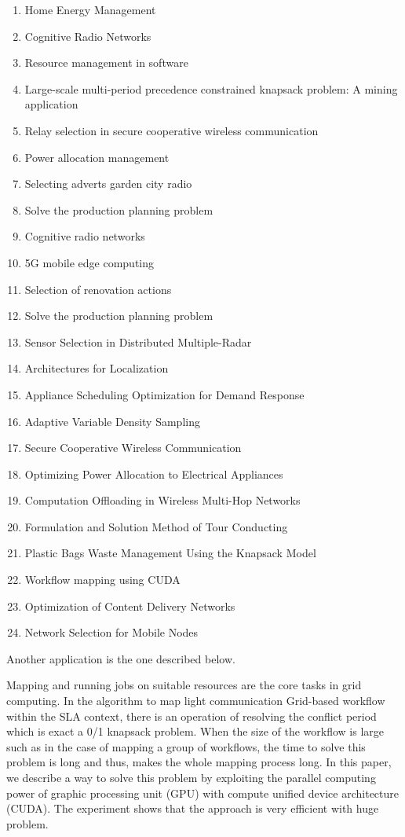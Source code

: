 \documentclass[12pt]{article}
\begin{document}
\begin{enumerate}
    \item Home Energy Management
    \item Cognitive Radio Networks
    \item Resource management in software
    \item Large-scale multi-period precedence constrained knapsack problem: A mining application
    \item Relay selection in secure cooperative wireless communication
    \item Power allocation management
    \item Selecting adverts garden city radio
    \item Solve the production planning problem
    \item Cognitive radio networks
    \item 5G mobile edge computing
    \item Selection of renovation actions
    \item Solve the production planning problem
    \item Sensor Selection in Distributed Multiple-Radar
    \item Architectures for Localization
    \item Appliance Scheduling Optimization for Demand Response
    \item Adaptive Variable Density Sampling
    \item Secure Cooperative Wireless Communication
    \item Optimizing Power Allocation to Electrical Appliances
    \item Computation Offloading in Wireless Multi-Hop Networks
    \item Formulation and Solution Method of Tour Conducting
    \item Plastic Bags Waste Management Using the Knapsack Model
    \item Workflow mapping using CUDA
    \item Optimization of Content Delivery Networks
    \item Network Selection for Mobile Nodes
\end{enumerate}

Another application is the one described below. \par 

Mapping and running jobs on suitable resources are the core tasks in grid computing. In the algorithm to map light communication Grid-based workflow within the SLA context, there is an operation of resolving the conflict period which is exact a 0/1 knapsack problem. When the size of the workflow is large such as in the case of mapping a group of workflows, the time to solve this problem is long and thus, makes the whole mapping process long. In this paper, we describe a way to solve this problem by exploiting the parallel computing power of graphic processing unit (GPU) with compute unified device architecture (CUDA). The experiment shows that the approach is very efficient with huge problem.
\end{document}
